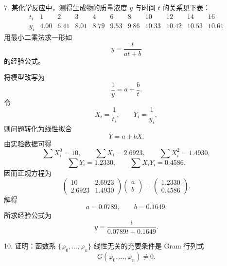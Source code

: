 \documentclass[11pt, a4paper]{ctexart}
\begin{document}
\begin{problem}{7. 某化学反应中，测得生成物的质量浓度 $y$ 与时间 $t$ 的关系见下表：}
    \[
        \begin{array}{c|cccccccccc}
            t_i & 1 & 2 & 3 & 4 & 6 & 8 & 10 & 12 & 14 & 16 \\ \hline
            y_i & 4.00 & 6.41 & 8.01 & 8.79 & 9.53 & 9.86 & 10.33 & 10.42 & 10.53 & 10.61
        \end{array}
    \]
    用最小二乘法求一形如
    \[
        y=\frac{t}{at+b}
    \]
    的经验公式。
\end{problem}

\begin{solution}
    将模型改写为
    \[
        \frac{1}{y}=a+\frac{b}{t}.
    \]
    令
    \[
        X_i=\frac{1}{t_i},\qquad Y_i=\frac{1}{y_i},
    \]
    则问题转化为线性拟合
    \[
        Y=a+bX.
    \]
    由实验数据可得
    \[
        \sum X_i^0=10,\qquad \sum X_i=2.6923,\qquad \sum X_i^2=1.4930,
    \]
    \[
        \sum Y_i=1.2330,\qquad \sum X_iY_i=0.4586.
    \]
    因而正规方程为
    \[
        \begin{pmatrix}
            10 & 2.6923 \\
            2.6923 & 1.4930
        \end{pmatrix}
        \begin{pmatrix}
            a \\
            b
        \end{pmatrix}
        =
        \begin{pmatrix}
            1.2330 \\
            0.4586
        \end{pmatrix}.
    \]
    解得
    \[
        a=0.0789,\qquad b=0.1649.
    \]
    所求经验公式为
    \[
        y=\frac{t}{0.0789t+0.1649}.
    \]
\end{solution}


\begin{problem}{10. 证明：函数系 $\{\varphi_0,\ldots,\varphi_n\}$ 线性无关的充要条件是 Gram 行列式}
    \[
        G(\varphi_0,\ldots,\varphi_n)\neq 0.
    \]
\end{problem}
\end{document}
